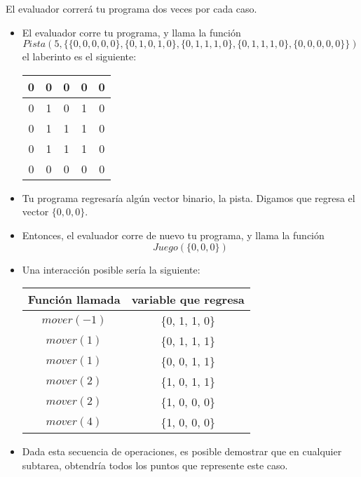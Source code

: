 \documentclass[12pt]{scrartcl}
\begin{document}
    El evaluador correrá tu programa dos veces por cada caso.


        \begin{itemize}
            \item El evaluador corre tu programa, y llama la función
            $$Pista(5, \{\{0, 0, 0, 0, 0\}, \{0, 1, 0, 1, 0\}, \{0, 1, 1, 1, 0\}, \{0, 1, 1, 1, 0\}, \{0, 0, 0, 0, 0\} \})$$
            el laberinto es el siguiente:
            \begin{center}
                \begin{tabular}{|c|c|c|c|c|}
                    \hline
                     0 & 0 & 0 & 0 & 0 \\
                     \hline
                     0 & 1 & 0 & 1 & 0 \\
                     \hline
                     0 & 1 & 1 & 1 & 0 \\
                     \hline
                     0 & 1 & 1 & 1 & 0 \\
                     \hline
                     0 & 0 & 0 & 0 & 0 \\
                     \hline
                \end{tabular}
            \end{center}
        \item Tu programa regresaría algún vector binario, la pista. Digamos que regresa el vector $\{0, 0, 0\}$.

        \item Entonces, el evaluador corre de nuevo tu programa, y llama la función 
        $$Juego(\{0, 0, 0\})$$
        \item Una interacción posible sería la siguiente:
        \begin{center}
            \begin{tabular}{|c|c|}
                \hline
                 Función llamada & variable que regresa \\
                 \hline
                 $mover(-1)$ & \{0, 1, 1, 0\} \\
                 \hline
                 $mover(1)$ & \{0, 1, 1, 1\} \\
                 \hline
                 $mover(1)$ & \{0, 0, 1, 1\} \\
                 \hline
                 $mover(2)$ & \{1, 0, 1, 1\} \\
                 \hline
                 $mover(2)$ & \{1, 0, 0, 0\} \\
                 \hline
                 $mover(4)$ & \{1, 0, 0, 0\} \\
                 \hline
                 
            \end{tabular}
            
        \end{center}
        \item Dada esta secuencia de operaciones, es posible demostrar que en cualquier subtarea, obtendría todos los puntos que represente este caso. 
        \end{itemize}
\end{document}
